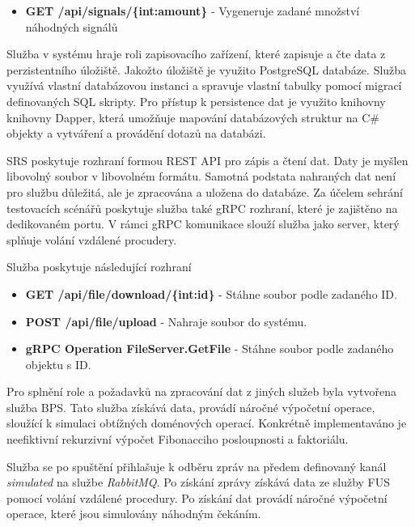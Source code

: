 \begin{itemize}
    \item \textbf{GET /api/signals/\{int:amount\}} - Vygeneruje zadané množství náhodných signálů
\end{itemize}


Služba v systému hraje roli zapisovacího zařízení, které zapisuje a čte data z perzistentního úložiště. Jakožto úložiště je využito PostgreSQL databáze. Služba využívá vlastní databázovou instanci a spravuje vlastní tabulky pomocí migrací definovaných SQL skripty. Pro přístup k persistence dat je využito knihovny knihovny Dapper, která umožňuje mapování databázových struktur na C\# objekty a vytváření a provádění dotazů na databázi.

SRS poskytuje rozhraní formou REST API pro zápis a čtení dat. Daty je myšlen libovolný soubor v libovolném formátu. Samotná podstata nahraných dat není pro službu důležitá, ale je zpracována a uložena do databáze. Za účelem sehrání testovacích scénářů poskytuje služba také gRPC rozhraní, které je zajištěno na dedikovaném portu. V rámci gRPC komunikace slouží služba jako server, který splňuje volání vzdálené procudery.

Služba poskytuje následující rozhraní

\begin{itemize}
    \item \textbf{GET /api/file/download/\{int:id\}} - Stáhne soubor podle zadaného ID.
    \item \textbf{POST /api/file/upload} - Nahraje soubor do systému.
    \item \textbf{gRPC Operation FileServer.GetFile} - Stáhne soubor podle zadaného objektu s ID.
\end{itemize}


Pro splnění role a požadavků na zpracování dat z jiných služeb byla vytvořena služba BPS. Tato služba získává data, provádí náročné výpočetní operace, sloužící k simulaci obtížných doménových operací. Konkrétně implementaváno je neefiktivní rekurzivní výpočet Fibonacciho posloupnosti a faktoriálu.

Služba se po spuštění přihlašuje k odběru zpráv na předem definovaný kanál \emph{simulated} na službe \emph{RabbitMQ}. Po získání zprávy získává data ze služby FUS pomocí volání vzdálené procedury. Po získání dat provádí náročné výpočetní operace, které jsou simulovány náhodným čekáním.

